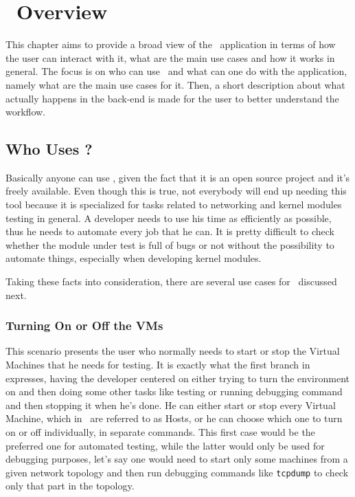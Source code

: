 \chapter{\project\ Overview}
\label{chapter:Chapter 3}

This chapter aims to provide a broad view of the \project\ application in terms of how the user can interact with it, what are the main use cases and how it works in general.
The focus is on who can use \project\ and what can one do with the application, namely what are the main use cases for it.
Then, a short description about what actually happens in the back-end is made for the user to better understand the workflow.

\section{Who Uses \project?}
\label{sec:who-uses-vlab}

Basically anyone can use \project, given the fact that it is an open source project and it's freely available.
Even though this is true, not everybody will end up needing this tool because it is specialized for tasks related to networking and kernel modules testing in general.
A developer needs to use his time as efficiently as possible, thus he needs to automate every job that he can.
It is pretty difficult to check whether the module under test is full of bugs or not without the possibility to automate things, especially when developing kernel modules.

Taking these facts into consideration, there are several use cases for \project\ discussed next.

\subsection{Turning On or Off the VMs}
\label{sub-sec:turning-on-off-vms}


This scenario presents the user who normally needs to start or stop the Virtual Machines that he needs for testing.
It is exactly what the first branch in  expresses, having the developer centered on either trying to turn the environment on and then doing some other tasks like testing or running debugging command and then stopping it when he's done.
He can either start or stop every Virtual Machine, which in \project\ are referred to as Hosts, or he can choose which one to turn on or off individually, in separate commands.
This first case would be the preferred one for automated testing, while the latter would only be used for debugging purposes, let's say one would need to start only some machines from a given network topology and then run debugging commands like \texttt{tcpdump} to check only that part in the topology.

